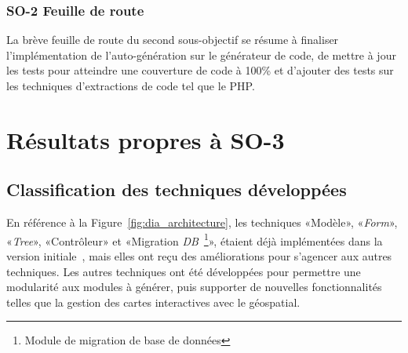 \subsubsection{SO-2 Feuille de route}
La brève feuille de route du second sous-objectif se résume à finaliser l’implémentation de l'auto-génération sur le générateur de code, de mettre à jour les tests pour atteindre une couverture de code à 100\% et d'ajouter des tests sur les techniques d’extractions de code tel que le PHP.

\section{Résultats propres à SO-3}

\subsection{Classification des techniques développées}\label{result_technique_developpe}

En référence à la Figure~\ref{fig:dia_architecture}, les techniques «Modèle», «\textit{Form}», «\textit{Tree}», «Contrôleur» et «Migration \textit{DB}~\footnote{Module de migration de base de données}», étaient déjà implémentées dans la version initiale~\cite{bluiksnot_repo}, mais elles ont reçu des améliorations pour s’agencer aux autres techniques. Les autres techniques ont été développées pour permettre une modularité aux modules à générer, puis supporter de nouvelles fonctionnalités telles que la gestion des cartes interactives avec le géospatial.

